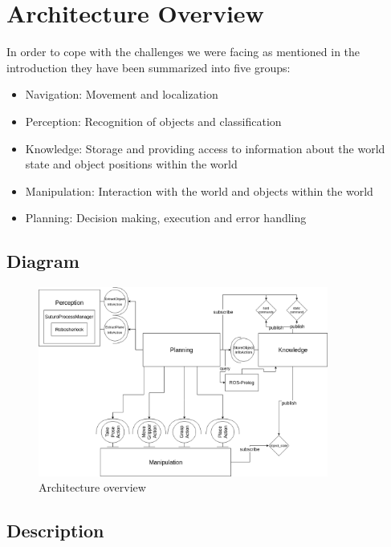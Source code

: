 \documentclass[main.tex]{subfiles}
\begin{document}
	\begingroup

	\renewcommand{\cleardoublepage}{}

	\renewcommand{\clearpage}{}

	\chapter{Architecture Overview}
		In order to cope with the challenges we were facing as mentioned in the introduction they have been summarized into five groups:
		\begin{itemize}
			\item Navigation: Movement and localization
			\item Perception: Recognition of objects and classification
			\item Knowledge: Storage and providing access to information about the world state and object positions within the world
			\item Manipulation: Interaction with the world and objects within the world
			\item Planning: Decision making, execution and error handling
		\end{itemize}

		\chapterauthor{}
		
		\section{Diagram}
		
		\begin{figure}	
			\centering
			\includegraphics[width=0.85\textwidth]{pictures/diagramms/architecture.png}
			\caption{Architecture overview}
			\label{architecture}
		\end{figure}
		
		\section{Description}
		
\end{document}
